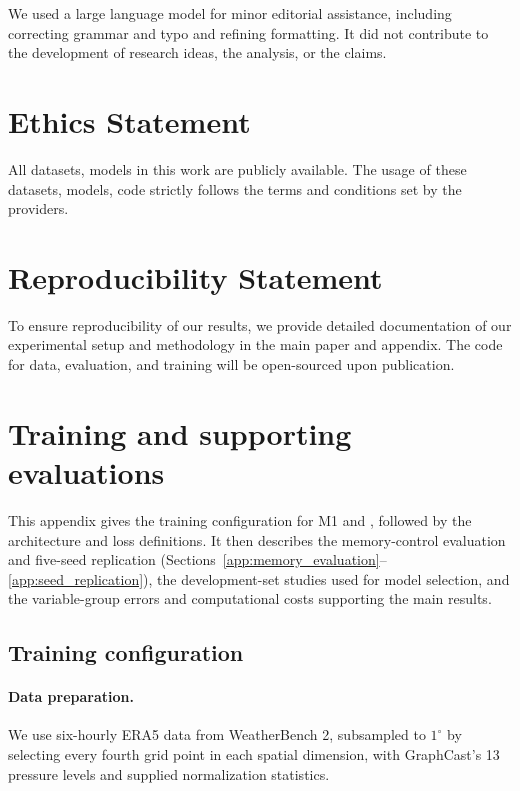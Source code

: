 \documentclass{article}
\newcommand{\suozhi}[1]{}
\renewcommand{\suozhi}[1]{}
\newcommand{\vfourchange}[1]{{\color{blue}#1}}
\newcommand{\vfourred}[1]{{\color{red}#1}}
\newif\ifvfivechanges
\newcommand{\vfiveidentity}[1]{#1}
\DeclareRobustCommand{\vfiveadded}[1]{\ifvfivechanges{\color{vfiveAdded}%
  \let\vfourchange\vfiveidentity\let\vfourred\vfiveidentity#1}\else{\color{blue}%
  \let\vfourchange\vfiveidentity\let\vfourred\vfiveidentity#1}\fi}
\DeclareRobustCommand{\vfivewordchange}[2]{\ifvfivechanges{\color{vfiveDeleted}\sout{#1}}\,\fi\vfiveadded{#2}}
\begin{document}
We used a large language model for minor editorial assistance, including correcting grammar and
typo and refining formatting. It did not contribute to the development of research ideas, the analysis,
or the claims.

\section*{Ethics Statement}
All datasets, models in this work are publicly available. The usage of these datasets, models, code strictly follows the terms and conditions set by the providers. 

\section*{Reproducibility Statement}
To ensure reproducibility of our results, we provide detailed documentation of our experimental setup and methodology in the main paper and appendix. The code for data, evaluation,
and training will be open-sourced upon publication.






\clearpage
\appendix

\section{\texorpdfstring{\vfourchange{Training and supporting evaluations}}{Training and supporting evaluations}}
\label{app:training}

\vfourchange{This appendix gives the training configuration for M1 and \vfivewordchange{its reset control}{R1}, followed by the architecture and loss definitions. It then describes the memory-control evaluation and five-seed replication (Sections~\ref{app:memory_evaluation}--\ref{app:seed_replication}), the development-set studies used for model selection, and the variable-group errors and computational costs supporting the main results.}

\subsection{Training configuration}
\label{app:training_configuration}

\paragraph{\vfourchange{Data preparation.}}
\vfourchange{We use six-hourly ERA5 data from WeatherBench 2, subsampled to $1^\circ$ by selecting every fourth grid point in each spatial dimension, with GraphCast's 13 pressure levels and supplied normalization statistics.}
\end{document}

